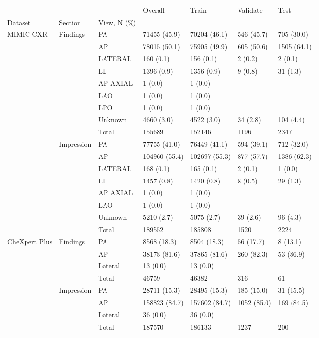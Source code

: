 \begin{tabular}{lllllll}
\toprule
 &  &  & Overall & Train & Validate & Test \\
Dataset & Section & View, N (\%) &  &  &  &  \\
\midrule
\multirow[c]{17}{*}{MIMIC-CXR} & \multirow[c]{9}{*}{Findings} & PA & 71455 (45.9) & 70204 (46.1) & 546 (45.7) & 705 (30.0) \\
 &  & AP & 78015 (50.1) & 75905 (49.9) & 605 (50.6) & 1505 (64.1) \\
 &  & LATERAL & 160 (0.1) & 156 (0.1) & 2 (0.2) & 2 (0.1) \\
 &  & LL & 1396 (0.9) & 1356 (0.9) & 9 (0.8) & 31 (1.3) \\
 &  & AP AXIAL & 1 (0.0) & 1 (0.0) &  &  \\
 &  & LAO & 1 (0.0) & 1 (0.0) &  &  \\
 &  & LPO & 1 (0.0) & 1 (0.0) &  &  \\
 &  & Unknown & 4660 (3.0) & 4522 (3.0) & 34 (2.8) & 104 (4.4) \\
 &  & Total & 155689 & 152146 & 1196 & 2347 \\
\cmidrule(lr){2-7}
 & \multirow[c]{8}{*}{Impression} & PA & 77755 (41.0) & 76449 (41.1) & 594 (39.1) & 712 (32.0) \\
 &  & AP & 104960 (55.4) & 102697 (55.3) & 877 (57.7) & 1386 (62.3) \\
 &  & LATERAL & 168 (0.1) & 165 (0.1) & 2 (0.1) & 1 (0.0) \\
 &  & LL & 1457 (0.8) & 1420 (0.8) & 8 (0.5) & 29 (1.3) \\
 &  & AP AXIAL & 1 (0.0) & 1 (0.0) &  &  \\
 &  & LAO & 1 (0.0) & 1 (0.0) &  &  \\
 &  & Unknown & 5210 (2.7) & 5075 (2.7) & 39 (2.6) & 96 (4.3) \\
 &  & Total & 189552 & 185808 & 1520 & 2224 \\
\cmidrule(lr){1-7} \cmidrule(lr){2-7}
\multirow[c]{8}{*}{CheXpert Plus} & \multirow[c]{4}{*}{Findings} & PA & 8568 (18.3) & 8504 (18.3) & 56 (17.7) & 8 (13.1) \\
 &  & AP & 38178 (81.6) & 37865 (81.6) & 260 (82.3) & 53 (86.9) \\
 &  & Lateral & 13 (0.0) & 13 (0.0) &  &  \\
 &  & Total & 46759 & 46382 & 316 & 61 \\
\cmidrule(lr){2-7}
 & \multirow[c]{4}{*}{Impression} & PA & 28711 (15.3) & 28495 (15.3) & 185 (15.0) & 31 (15.5) \\
 &  & AP & 158823 (84.7) & 157602 (84.7) & 1052 (85.0) & 169 (84.5) \\
 &  & Lateral & 36 (0.0) & 36 (0.0) &  &  \\
 &  & Total & 187570 & 186133 & 1237 & 200 \\
\cmidrule(lr){1-7} \cmidrule(lr){2-7}
\bottomrule
\end{tabular}
